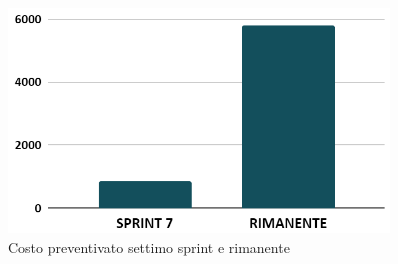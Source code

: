 \begin{figure}[h!]
    \centering
    \includegraphics[width=0.9\textwidth]{prev7costo.png}
    \caption{Costo preventivato settimo sprint e rimanente}
    \label{fig:preventivocostosettimosprint}
\end{figure}


\newpage
